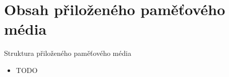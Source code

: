 \chapter{Obsah přiloženého paměťového média}
Struktura přiloženého paměťového média
\begin{itemize}
\item TODO
\end{itemize}
